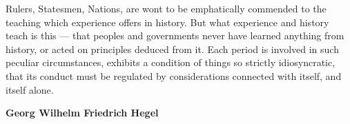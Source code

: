 \begin{dedication}
  Rulers, Statesmen, Nations, are wont to be emphatically commended to the
  teaching which experience offers in history. But what experience and history
  teach is this --- that peoples and governments never have learned anything
  from history, or acted on principles deduced from it. Each period is involved
  in such peculiar circumstances, exhibits a condition of things so strictly
  idiosyncratic, that its conduct must be regulated by considerations connected
  with itself, and itself alone.

  \vspace{\baselineskip}
  \raggedleft  \Large \bfseries \cmunbi Georg Wilhelm Friedrich Hegel
\end{dedication} 
